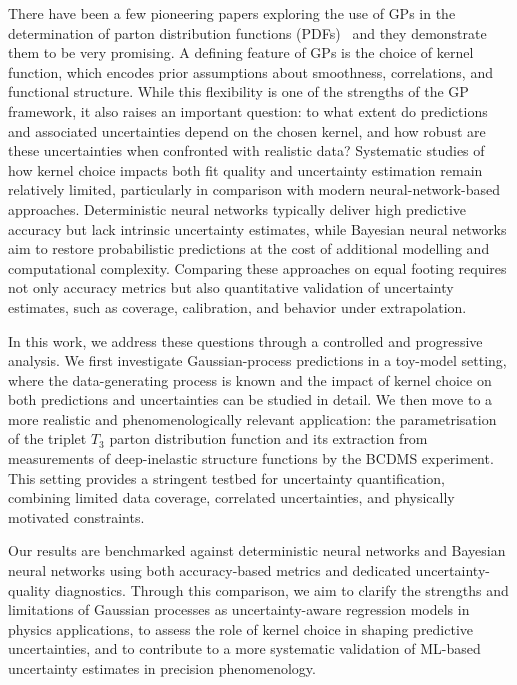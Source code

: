 \documentclass[11pt,a4paper]{article}
\begin{document}
There have been a few pioneering papers exploring the use of GPs in the determination of parton distribution functions (PDFs)~\cite{Candido:2024hjt,Medrano:2025cmg} 
and they demonstrate them to be very promising. A defining feature of GPs is the choice of kernel function, which encodes prior assumptions about smoothness, 
correlations, and functional structure. While this flexibility is one of the strengths of the GP framework, it also raises an important question: to what extent do predictions and associated uncertainties depend on the chosen kernel, and how robust are these uncertainties when confronted with realistic data?
Systematic studies of how kernel choice impacts both fit quality and uncertainty estimation remain relatively limited, particularly in comparison with modern neural-network-based approaches. Deterministic neural networks typically deliver high predictive accuracy but lack intrinsic uncertainty estimates, while Bayesian neural networks aim to restore probabilistic predictions at the cost of additional modelling and computational complexity. Comparing these approaches on equal footing requires not only accuracy metrics but also quantitative validation of uncertainty estimates, such as coverage, calibration, and behavior under extrapolation.

In this work, we address these questions through a controlled and progressive analysis. We first investigate Gaussian-process predictions in a toy-model setting, where the data-generating process is known and the impact of kernel choice on both predictions and uncertainties can be studied in detail. We then move to a more realistic and phenomenologically relevant application: the parametrisation of the triplet $T_3$ parton distribution function and its extraction from measurements of deep-inelastic structure functions by the BCDMS experiment. 
This setting provides a stringent testbed for uncertainty quantification, combining limited data coverage, correlated uncertainties, and physically motivated constraints.

Our results are benchmarked against deterministic neural networks and Bayesian neural networks using both accuracy-based metrics and dedicated uncertainty-quality diagnostics. Through this comparison, we aim to clarify the strengths and limitations of Gaussian processes as uncertainty-aware regression models in physics applications, to assess the role of kernel choice in shaping predictive uncertainties, and to contribute to a more systematic validation of ML-based uncertainty estimates in precision phenomenology.
\end{document}
